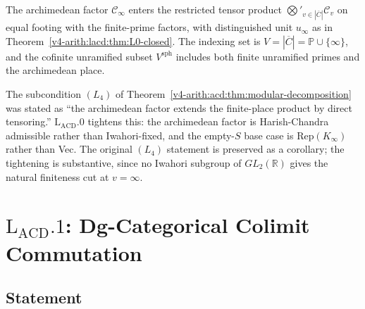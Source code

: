 \begin{corollary}
\label{v4-arith:lacd:cor:arch-factor-enters}
The archimedean factor \(\mathcal{C}_{\infty}\)
enters the restricted tensor product
\(\bigotimes'_{v \in |\overline{C}|}\mathcal{C}_{v}\) on equal footing
with the finite-prime factors, with distinguished unit
\(u_{\infty}\) as in Theorem~\ref{v4-arith:lacd:thm:L0-closed}. The indexing
set is \(V = |\overline{C}| = \mathbb{P} \cup \{\infty\}\), and the
cofinite unramified subset \(V^{\mathrm{sph}}\) includes both
finite unramified primes and the archimedean place.
\end{corollary}

\begin{remark}
\label{v4-arith:lacd:rem:L4-reconciliation}
The subcondition \((L_{4})\) of Theorem~\ref{v4-arith:acd:thm:modular-decomposition}
was stated as ``the archimedean factor extends the finite-place product by
direct tensoring.'' \(\mathrm{L}_{\mathrm{ACD}}.0\) tightens this: the
archimedean factor is Harish-Chandra admissible rather than Iwahori-fixed,
and the empty-\(S\) base case is \(\mathrm{Rep}(K_{\infty})\) rather than
Vec. The original \((L_{4})\) statement is preserved as a corollary;
the tightening is substantive, since no Iwahori subgroup of
\(GL_{2}(\mathbb{R})\) gives the natural finiteness cut at \(v = \infty\).
\end{remark}

\section{\(\mathrm{L}_{\mathrm{ACD}}.1\): Dg-Categorical Colimit Commutation}
\label{v4-arith:lacd:L1}

\subsection{Statement}

